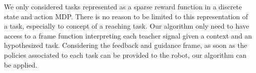 We only considered tasks represented as a sparse reward function in a discrete state and action MDP. There is no reason to be limited to this representation of a task, especially to concept of a reaching task. Our algorithm only need to have access to a frame function interpreting each teacher signal given a context and an hypothesized task. Considering the feedback and guidance frame, as soon as the policies associated to each task can be provided to the robot, our algorithm can be applied. 







